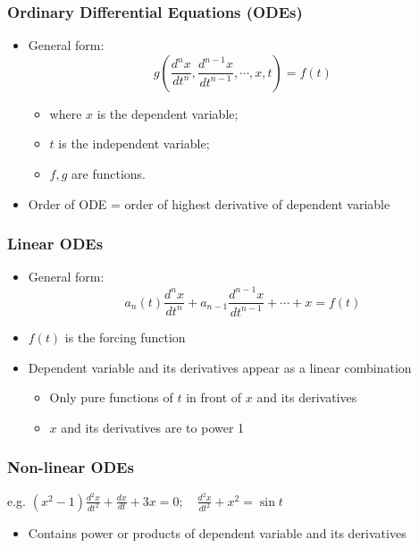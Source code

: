 \documentclass[a4paper]{article}
\begin{document}
\newpage
\subsubsection{Ordinary Differential Equations (ODEs)}
\begin{itemize}
    \item General form:
    $$g\left(\frac{d^n x}{dt^n},\frac{d^{n-1}x}{dt^{n-1}},\cdots, x, t\right) = f(t)$$
    \begin{itemize}[label=$\circ$]
        \item where $x$ is the dependent variable;
        \item $t$ is the independent variable;
        \item $f, g$ are functions.
    \end{itemize}
    \item Order of ODE = order of highest derivative of dependent variable
\end{itemize}
\subsubsection{Linear ODEs}
\begin{itemize}
    \item General form:
    $$a_n(t)\frac{d^n x}{dt^n}+a_{n-1}\frac{d^{n-1}x}{dt^{n-1}}+\cdots + x = f(t)$$
    \item $f(t)$ is the forcing function
    \item Dependent variable and its derivatives appear as a linear combination
    \begin{itemize}[label=$\circ$]
        \item Only pure functions of $t$ in front of $x$ and its derivatives
        \item $x$ and its derivatives are to power 1
    \end{itemize}
\end{itemize}
\subsubsection{Non-linear ODEs}
\begin{center}
    e.g. $\displaystyle (x^2-1)\frac{d^2 x}{dt^2}+\frac{dx}{dt}+3x = 0; \quad \frac{d^2 x}{dt^2}+x^2 = \sin t$
\end{center}
\begin{itemize}
    \item Contains power or products of dependent variable and its derivatives
\end{itemize}
\end{document}

